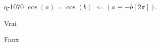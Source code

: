 \begin{truefalse}{q-1070}
$\cos(a)=\cos(b)$  $\Leftarrow \left(a\equiv -b [2\pi]\right)$.
\item* Vrai
\item Faux
\end{truefalse}

